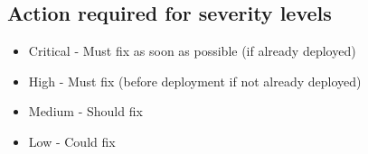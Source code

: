 \hypertarget{action-required-for-severity-levels}{%
\subsection{Action required for severity
levels}\label{action-required-for-severity-levels}}

\begin{itemize}
\tightlist
\item
  Critical - Must fix as soon as possible (if already deployed)
\item
  High - Must fix (before deployment if not already deployed)
\item
  Medium - Should fix
\item
  Low - Could fix
\end{itemize} 
